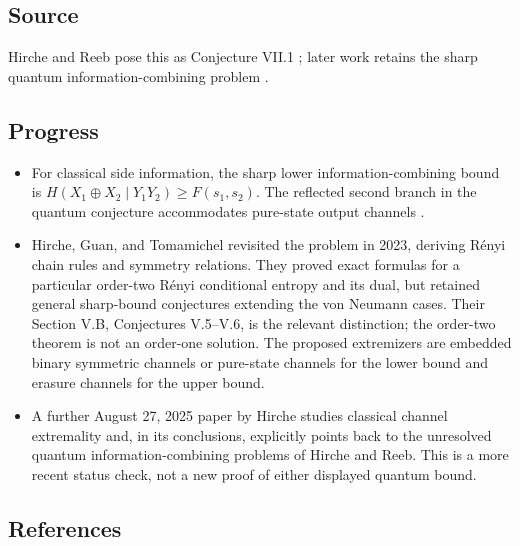 \subsection*{Source}

Hirche and Reeb pose this as Conjecture VII.1 ; later work retains the sharp quantum information-combining problem .

\subsection*{Progress}

\begin{itemize}
  \item For classical side information, the sharp lower information-combining bound is $H(X_1\oplus X_2\mid Y_1Y_2)\geq F(s_1,s_2)$. The reflected second branch in the quantum conjecture accommodates pure-state output channels .

  \item Hirche, Guan, and Tomamichel revisited the problem in 2023, deriving Rényi chain rules and symmetry relations. They proved exact formulas for a particular order-two Rényi conditional entropy and its dual, but retained general sharp-bound conjectures extending the von Neumann cases. Their Section V.B, Conjectures V.5–V.6, is the relevant distinction; the order-two theorem is not an order-one solution. The proposed extremizers are embedded binary symmetric channels or pure-state channels for the lower bound and erasure channels for the upper bound. 

  \item A further August 27, 2025 paper by Hirche studies classical channel extremality and, in its conclusions, explicitly points back to the unresolved quantum information-combining problems of Hirche and Reeb. This is a more recent status check, not a new proof of either displayed quantum bound. 
\end{itemize}

\subsection*{References}

